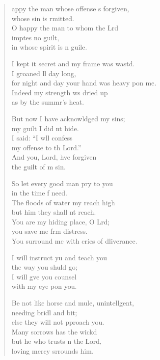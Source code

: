 \begin{verse}
  \begin{patverse}
appy the man whose offense \pointup{\i}s forgiven,\Med\\
whose sin is rmitted.\\
O happy the man to whom the Lrd\Flex\\
imptes no guilt,\Med\\
in whose spirit is n guile.

I kept it secret and my frame was wastd.\Flex\\
I groaned ll day long,\Med\\
for night and day your hand was heavy pon me.\\
Indeed my strength ws dried up\Med\\
as by the summr’s heat.

But now I have acknowldged my sins;\Med\\
my guilt I did nt hide.\\
I said: “I w\pointup{\i}ll confess\Med\\
my offense to th Lord.”\\
And you, Lord, hve forgiven\Med\\
the guilt of m sin.

So let every good man pry to you\Med\\
in the time f need.\\
The floods of water my reach high\Med\\
but him they shall nt reach.\\
You are my hiding place, O Lrd;\Flex\\
you save me frm distress.\Med\\
You surround me with cries of dliverance.

I will instruct yu and teach you\Med\\
the way you shuld go;\\
I will g\pointup{\i}ve you counsel\Med\\
with my eye pon you.

Be not like horse and mule, unintell\pointup{\i}gent,\Flex\\
needing bridl and bit;\Med\\
else they will not pproach you.\Med\\
Many sorrows has the wickd\\
but he who trusts \pointup{\i}n the Lord,\Med\\
loving mercy srrounds him.


\end{patverse}
\end{verse}
